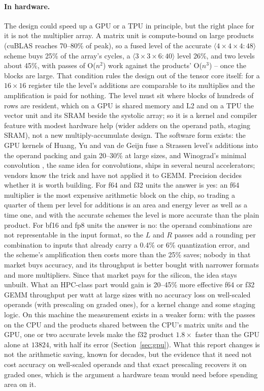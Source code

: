 \documentclass[11pt]{article}
\newcommand{\mm}[1]{\langle #1\rangle}
\begin{document}
\paragraph{In hardware.}
The design could speed up a GPU or a TPU in principle, but the right place
for it is not the multiplier array.  A matrix unit is compute-bound on large
products (cuBLAS reaches 70--80\% of peak), so a fused level of the accurate
$\mm{4\times4\times4:48}$ scheme buys 25\% of the array's cycles, a $\mm{3\times3\times6:40}$ level
26\%, and two levels about 45\%, with passes of O($n^2$) work against the
products' O($n^3$) -- once the blocks are large.  That condition rules the
design out of the tensor core itself: for a $16\times16$ register tile the
level's additions are comparable to its multiplies and the amplification is
paid for nothing.  The level must sit where blocks of hundreds of rows are
resident, which on a GPU is shared memory and L2 and on a TPU the vector unit
and its SRAM beside the systolic array; so it is a kernel and compiler
feature with modest hardware help (wider adders on the operand path, staging
SRAM), not a new multiply-accumulate design.  The software form exists: the
GPU kernels of Huang, Yu and van de Geijn \cite{HYvdG20} fuse a Strassen
level's additions into the operand packing and gain 20--30\% at large sizes,
and Winograd's minimal convolution \cite{LG16}, the same idea for
convolutions, ships in several neural accelerators; vendors know the trick
and have not applied it to GEMM.  Precision decides whether it is worth
building.  For f64 and f32 units the answer is yes: an f64 multiplier is the
most expensive arithmetic block on the chip, so trading a quarter of them per
level for additions is an area and energy lever as well as a time one, and
with the accurate schemes the level is more accurate than the plain product.
For bf16 and fp8 units the answer is no: the operand combinations are not
representable in the input format, so the $L$ and $R$ passes add a rounding
per combination to inputs that already carry a 0.4\% or 6\% quantization
error, and the scheme's amplification then costs more than the 25\% saves;
nobody in that market buys accuracy, and its throughput is better bought with
narrower formats and more multipliers.  Since that market pays for the
silicon, the idea stays unbuilt.  What an HPC-class part would gain is
20--45\% more effective f64 or f32 GEMM throughput per watt at large sizes
with no accuracy loss on well-scaled operands (with prescaling on graded
ones), for a kernel change and some staging logic.  On this
machine the measurement exists in a weaker form: with the passes on the CPU
and the products shared between the CPU's matrix units and the GPU, one or
two accurate levels make the f32 product $1.8\times$ faster than the GPU
alone at $13824$, with half its error (Section~\ref{sec:gpu}).  What this report changes is not the arithmetic
saving, known for decades, but the evidence that it need not cost accuracy
on well-scaled operands and that exact prescaling recovers it on graded
ones, which is the argument a hardware team would need before spending area on it.
\end{document}
